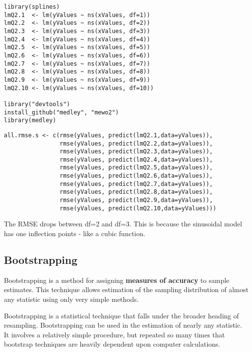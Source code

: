 \documentclass[12pt]{article}
\begin{document}
\begin{framed}
\begin{verbatim}
library(splines)
lmQ2.1  <- lm(yValues ~ ns(xValues, df=1))
lmQ2.2  <- lm(yValues ~ ns(xValues, df=2))
lmQ2.3  <- lm(yValues ~ ns(xValues, df=3))
lmQ2.4  <- lm(yValues ~ ns(xValues, df=4))
lmQ2.5  <- lm(yValues ~ ns(xValues, df=5))
lmQ2.6  <- lm(yValues ~ ns(xValues, df=6))
lmQ2.7  <- lm(yValues ~ ns(xValues, df=7))
lmQ2.8  <- lm(yValues ~ ns(xValues, df=8))
lmQ2.9  <- lm(yValues ~ ns(xValues, df=9))
lmQ2.10 <- lm(yValues ~ ns(xValues, df=10))

library("devtools")
install_github("medley", "mewo2") 
library(medley)
\end{verbatim}
\end{framed}
\newpage

\begin{framed}
\begin{verbatim}
all.rmse.s <- c(rmse(yValues, predict(lmQ2.1,data=yValues)),
                rmse(yValues, predict(lmQ2.2,data=yValues)),
                rmse(yValues, predict(lmQ2.3,data=yValues)),
                rmse(yValues, predict(lmQ2.4,data=yValues)),
                rmse(yValues, predict(lmQ2.5,data=yValues)),
                rmse(yValues, predict(lmQ2.6,data=yValues)),
                rmse(yValues, predict(lmQ2.7,data=yValues)),
                rmse(yValues, predict(lmQ2.8,data=yValues)),
                rmse(yValues, predict(lmQ2.9,data=yValues)),
                rmse(yValues, predict(lmQ2.10,data=yValues)))
\end{verbatim}
\end{framed}
The RMSE drops between df=2 and df=3. This is because the sinusoidal model has one inflection points - like a cubic function.

\newpage
\subsection*{Bootstrapping}
Bootstrapping is a method for assigning \textbf{measures of accuracy} to sample estimates. This technique allows estimation of the sampling distribution of almost any statistic using only very simple methods.

Bootstrapping is a statistical technique that falls under the broader heading of resampling. Bootstrapping can be used in the estimation of nearly any statistic. It involves a relatively simple procedure, but repeated so many times that bootstrap techniques are heavily dependent upon computer calculations.
\end{document}
